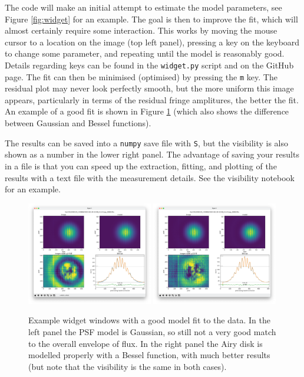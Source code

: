\documentclass[11pt]{article}
\begin{document}
The code will make an initial attempt to estimate the model parameters, see Figure \ref{fig:widget} for an example. The goal is then to improve the fit, which will almost certainly require some interaction. This works by moving the mouse cursor to a location on the image (top left panel), pressing a key on the keyboard to change some parameter, and repeating until the model is reasonably good. Details regarding keys can be found in the \texttt{widget.py} script and on the GitHub page. The fit can then be minimised (optimised) by pressing the \texttt{m} key. The residual plot may never look perfectly smooth, but the more uniform this image appears, particularly in terms of the residual fringe amplitures, the better the fit. An example of a good fit is shown in Figure \ref{fig:widget2} (which also shows the difference between Gaussian and Bessel functions).

The results can be saved into a \texttt{numpy} save file with \texttt{S}, but the visibility is also shown as a number in the lower right panel. The advantage of saving your results in a file is that you can speed up the extraction, fitting, and plotting of the results with a text file with the measurement details. See the visibility notebook for an example.

\begin{figure}[h]
    \centering
    \includegraphics[width=0.49\textwidth]{widget2.png}
    \includegraphics[width=0.49\textwidth]{widget3.png}
    \caption{Example widget windows with a good model fit to the data. In the left panel the PSF model is Gaussian, so still not a very good match to the overall envelope of flux. In the right panel the Airy disk is modelled properly with a Bessel function, with much better results (but note that the visibility is the same in both cases).}
    \label{fig:widget2}
\end{figure}
\end{document}
